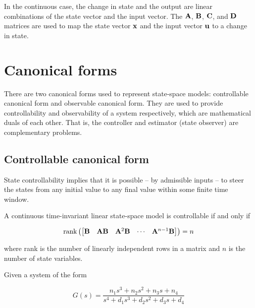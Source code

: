 In the continuous case, the change in state and the output are linear
combinations of the state vector and the input vector. The $\mathbf{A}$, $\mathbf{B}$,
$\mathbf{C}$, and $\mathbf{D}$ matrices are used to map the state vector $\mathbf{x}$ and
the input vector $\mathbf{u}$ to a change in state.

\section{Canonical forms}

There are two canonical forms used to represent state-space \glspl{model}:
controllable canonical form and observable canonical form. They are used to
provide controllability and observability of a system respectively, which are
mathematical duals of each other. That is, the controller and estimator (state
observer) are complementary problems.

\subsection{Controllable canonical form} \label{subsubsec:ctrl-canon}

State controllability implies that it is possible -- by admissible inputs -- to
steer the \glspl{state} from any initial value to any final value within some
finite time window.

\begin{theorem}
  A continuous \gls{time-invariant} linear state-space \gls{model} is
  controllable if and only if

  \begin{equation}
    \text{rank} \left(
    \begin{bmatrix}
      \mathbf{B} & \mathbf{A}\mathbf{B} & \mathbf{A}^2\mathbf{B} & \cdots &
      \mathbf{A}^{n-1}\mathbf{B}
    \end{bmatrix}
    \right) = n
    \label{eq:ctrl_rank}
  \end{equation}

  where rank is the number of linearly independent rows in a matrix and $n$ is
  the number of \gls{state} variables.
\end{theorem}

Given a \gls{system} of the form

\begin{equation} \label{eq:ctrl_obsv_tf}
  G(s) = \frac{n_1 s^3 + n_2 s^2 + n_3 s + n_4}
    {s^4 + d_1 s^3 + d_2 s^2 + d_3 s + d_4}
\end{equation}

